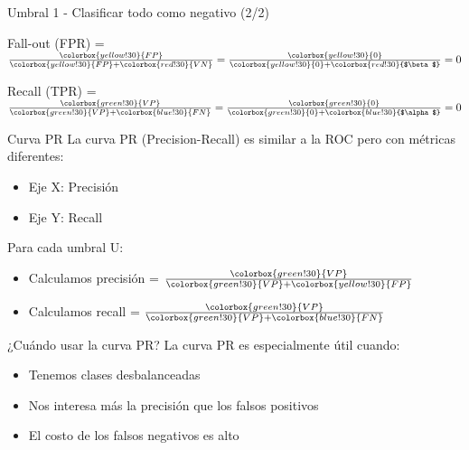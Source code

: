 \documentclass{beamer}
\begin{document}
\begin{frame}{Umbral 1 - Clasificar todo como negativo (2/2)}
    \begin{center}
    Fall-out (FPR) = $\frac{\colorbox{yellow!30}{FP}}{\colorbox{yellow!30}{FP} + \colorbox{red!30}{VN}} = \frac{\colorbox{yellow!30}{0}}{\colorbox{yellow!30}{0} + \colorbox{red!30}{$\beta$}} = 0$

    Recall (TPR) = $\frac{\colorbox{green!30}{VP}}{\colorbox{green!30}{VP} + \colorbox{blue!30}{FN}} = \frac{\colorbox{green!30}{0}}{\colorbox{green!30}{0} + \colorbox{blue!30}{$\alpha$}} = 0$
    \end{center}
\end{frame}

\begin{frame}{Curva PR}
La curva PR (Precision-Recall) es similar a la ROC pero con métricas diferentes:

\begin{itemize}
    \item Eje X: Precisión
    \item Eje Y: Recall
\end{itemize}

\vspace{0.5em}

Para cada umbral U:
\begin{itemize}
    \item Calculamos precisión = $\frac{\colorbox{green!30}{VP}}{\colorbox{green!30}{VP} + \colorbox{yellow!30}{FP}}$
    \item Calculamos recall = $\frac{\colorbox{green!30}{VP}}{\colorbox{green!30}{VP} + \colorbox{blue!30}{FN}}$
\end{itemize}
\end{frame}

\begin{frame}{¿Cuándo usar la curva PR?}
La curva PR es especialmente útil cuando:
\begin{itemize}
    \item Tenemos clases desbalanceadas
    \item Nos interesa más la precisión que los falsos positivos
    \item El costo de los falsos negativos es alto
\end{itemize}
\end{frame}
\end{document}
